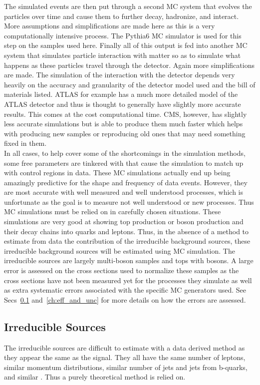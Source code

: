 	The simulated events are then put through a second MC system that evolves the particles over time and cause them to further decay, hadronize, and interact. More assumptions and simplifications are made here as this is a very computationally intensive process. The Pythia6 MC simulator is used for this step on the samples used here. Finally  all of this output is fed into another MC system that simulates particle interaction with matter so as to simulate what happens as these particles travel through the detector. Again more simplifications are made. The simulation of the interaction with the detector depends very heavily on the accuracy and granularity of the detector model used and the bill of materials listed. ATLAS for example has a much more detailed model of the ATLAS detector and thus is thought to generally have slightly more accurate results. This comes at the cost computational time. CMS, however, has slightly less accurate simulations but is able to produce them much faster which helps with producing new samples or reproducing old ones that may need something fixed in them.\\
	
	In all cases, to help cover some of the shortcomings in the simulation methods, some free parameters are tinkered with that cause the simulation to match up with control regions in data. These MC simulations actually end up being amazingly predictive for the shape and frequency of data events. However, they are most accurate with well measured and well understood processes, which is unfortunate as the goal is to measure not well understood or new processes. Thus MC simulations must be relied on in carefully chosen situations. These simulations are very good at showing top production or boson production and their decay chains into quarks and leptons. Thus, in the absence of a method to estimate from data the contribution of the irreducible background sources, these irreducible background sources will be estimated using MC simulation. The irreducible sources are largely multi-boson samples and tops with bosons. A large error is assessed on the cross sections used to normalize these samples as the cross sections have not been measured yet for the processes they simulate as well as extra systematic errors associated with the specific MC generators used. See Secs~\ref{sec:irreducible_sources} and~\ref{ch:eff_and_unc} for more details on how the errors are assessed.
	
	\subsection{Irreducible Sources}
	\label{sec:irreducible_sources}
        		The irreducible sources are difficult to estimate with a data derived method as they appear the same as the signal. They all have the same number of leptons, similar momentum distributions, similar number of jets and jets from b-quarks, and similar \met. Thus a purely theoretical method is relied on.\\ 
		
